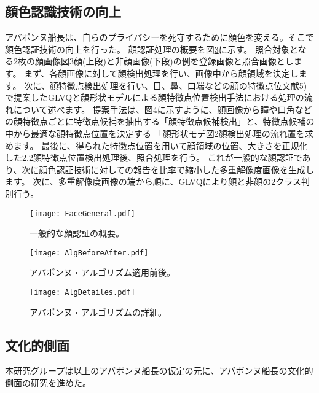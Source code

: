 \subsection{顔色認識技術の向上}
アバポンヌ船長は、自らのプライバシーを死守するために顔色を変える。そこで顔色認証技術の向上を行った。
顔認証処理の概要を図\ref{fig:FaceGeneral}に示す。
照合対象となる2枚の顔画像図3顔(上段)と非顔画像(下段)の例を登録画像と照合画像とします。
まず、各顔画像に対して顔検出処理を行い、画像中から顔領域を決定します。
次に、顔特徴点検出処理を行い、目、鼻、口端などの顔の特徴点位文献5)で提案したGLVQと顔形状モデルによる顔特徴点位置検出手法における処理の流れについて述べます。
提案手法は、図4に示すように、顔画像から瞳や口角などの顔特徴点ごとに特徴点候補を抽出する「顔特徴点候補検出」と、特徴点候補の中から最適な顔特徴点位置を決定する
「顔形状モデ図2顔検出処理の流れ置を求めます。
最後に、得られた特徴点位置を用いて顔領域の位置、大きさを正規化した2.2顔特徴点位置検出処理後、照合処理を行う。
これが一般的な顔認証であり、次に顔色認証技術に対しての報告を比率で縮小した多重解像度画像を生成します。
次に、多重解像度画像の端から順に、GLVQにより顔と非顔の2クラス判別行う。

\begin{figure}
\centering
\texttt{[image: FaceGeneral.pdf]}
\caption{一般的な顔認証の概要。}
\label{fig:FaceGeneral}
\end{figure}

\begin{figure}
\centering
\texttt{[image: AlgBeforeAfter.pdf]}
\caption{アバポンヌ・アルゴリズム適用前後。}
\label{fig:FaceGeneral}
\end{figure}

\begin{figure}
\centering
\texttt{[image: AlgDetailes.pdf]}
\caption{アバポンヌ・アルゴリズムの詳細。}
\label{fig:FaceGeneral}
\end{figure}



\subsection{文化的側面}
本研究グループは以上のアバポンヌ船長の仮定の元に、アバポンヌ船長の文化的側面の研究を進めた。

